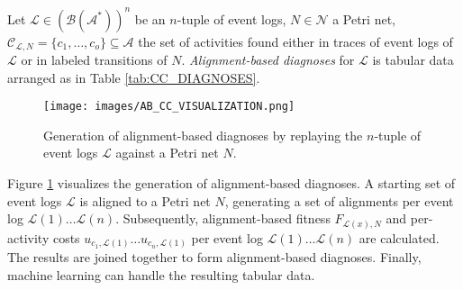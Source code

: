 \begin{definition}
\label{def:ab_cc}
Let $\mathcal{L}\in(\mathcal{B}(\mathcal{A}^*))^n$ be an $n$-tuple of event logs, $N\in\mathcal{N}$ a Petri net, $\mathcal{C}_{\mathcal{L},N}=\{c_1,\dots,c_o\}\subseteq\mathcal{A}$ the set of activities found either in traces of event logs of $\mathcal{L}$ or in labeled transitions of $N$. \emph{Alignment-based  diagnoses} for $\mathcal{L}$ is tabular data arranged as in Table \ref{tab:CC_DIAGNOSES}.
\end{definition}
\begin{figure}[!t]
\centering
\texttt{[image: images/AB\_CC\_VISUALIZATION.png]}
\caption{Generation of alignment-based  diagnoses by replaying the $n$-tuple of event logs $\mathcal{L}$ against a Petri net $N$.}
\label{AB_CC_VISUALIZATION}
\end{figure}

Figure \ref{AB_CC_VISUALIZATION} visualizes the generation of alignment-based  diagnoses. A starting set of event logs $\mathcal{L}$ is aligned to a Petri net $N$, generating a set of alignments per event log $\mathcal{L}(1)\dots\mathcal{L}(n)$. Subsequently, alignment-based fitness $F_{\mathcal{L}(x),N}$ and per-activity costs $u_{c_1,\mathcal{L}(1)}\dots u_{c_n,\mathcal{L}(1)}$ per event log $\mathcal{L}(1)\dots\mathcal{L}(n)$ are calculated. The results are joined together to form alignment-based  diagnoses. Finally, machine learning can handle the resulting tabular data.

